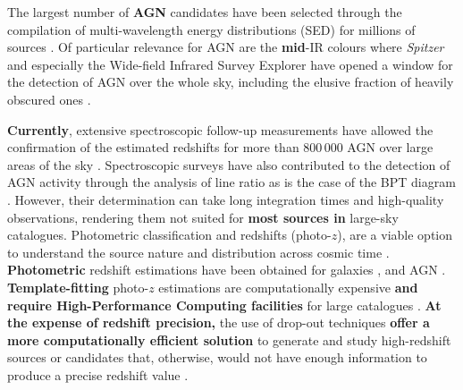 \documentclass{aa}
\begin{document}
The largest number of \textbf{AGN} candidates have been selected through the compilation of multi-wavelength energy distributions (SED) for millions of sources \citep{2018ARA&A..56..625H, 2020PhDT.........3P}.  Of particular relevance for AGN are the \textbf{mid}-IR colours where \textit{Spitzer} \citep{2004ApJS..154....1W} and especially  the Wide-field Infrared Survey Explorer \citep[\textit{WISE};][]{2010AJ....140.1868W} have opened a window for the detection of AGN over the whole sky, including the elusive fraction of heavily obscured ones \citep[e.g.][]{2012ApJ...753...30S, 2012MNRAS.426.3271M, 2017ApJ...836..182J, 2018ApJS..234...23A, 2021ApJ...922..179B}. %

\textbf{Currently}, extensive spectroscopic follow-up measurements have allowed the confirmation of the estimated redshifts for more than $800\,000$ AGN over large areas of the sky \citep{2021arXiv210512985F}. Spectroscopic surveys have also contributed to the detection of AGN activity through the analysis of line ratio as is the case of the BPT diagram \citep*{1981PASP...93....5B}. However, their determination can take long integration times and high-quality observations, rendering them not suited for \textbf{most sources in} large-sky catalogues. Photometric classification and redshifts (photo-$z$), are a viable option to understand the source nature and distribution across cosmic time \citep{1957AJ.....62....6B, 2019NatAs...3..212S}. \textbf{Photometric} redshift estimations have been obtained for galaxies \citep[e.g.][]{2021A&A...654A.101H}, and AGN \citep[e.g.][]{2017ApJ...850...66A}. \textbf{Template-fitting} photo-$z$ estimations are computationally expensive \textbf{and require High-Performance Computing facilities} for large catalogues \citet[${\gtrsim}10^{7}$, ][]{2021ApJ...916...43G}. \textbf{At the expense of redshift precision,} the use of drop-out techniques \textbf{offer a more computationally efficient solution} to generate and study high-redshift sources or candidates that, otherwise, would not have enough information to produce a precise redshift value \citep[e.g.][]{2020ApJ...902..112B, 2020A&A...633A.160C, 2023MNRAS.519.4902S}.
\end{document}
